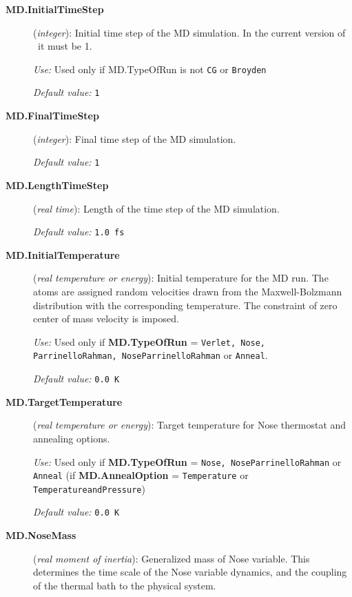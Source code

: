 \begin{description}
\item[\textbf{MD.InitialTimeStep}] (\textit{integer}):
Initial time step of the MD simulation.
In the current version of \siesta\ it must be 1.

\textit{Use:} Used only if MD.TypeOfRun is not \texttt{CG} or \texttt{Broyden}

\textit{Default value:} \texttt{1}

\item[\textbf{MD.FinalTimeStep}] (\textit{integer}):
Final time step of the MD simulation.

\textit{Default value:} \texttt{1}

\item[\textbf{MD.LengthTimeStep}] (\textit{real time}):
Length of the time step of the MD simulation.

\textit{Default value:} \texttt{1.0 fs}

\item[\textbf{MD.InitialTemperature}] (\textit{real temperature or energy}):
Initial temperature for the MD run. The atoms are assigned random
velocities drawn from the Maxwell-Bolzmann distribution with the
corresponding temperature. The constraint of zero center of
mass velocity is imposed.

\textit{Use:} Used only if \textbf{MD.TypeOfRun} = \texttt{Verlet, Nose,
ParrinelloRahman, NoseParrinelloRahman}
or \texttt{Anneal}.

\textit{Default value:} \texttt{0.0 K}


\item[\textbf{MD.TargetTemperature}] (\textit{real temperature or energy}):
Target temperature for Nose thermostat and annealing options.

\textit{Use:} Used only if \textbf{MD.TypeOfRun} = \texttt{Nose, NoseParrinelloRahman}
or \texttt{Anneal} (if \textbf{MD.AnnealOption} = \texttt{Temperature} or
\texttt{TemperatureandPressure})

\textit{Default value:} \texttt{0.0 K}



\item[\textbf{MD.NoseMass}] (\textit{real moment of inertia}):
Generalized mass of Nose variable.
This determines the time scale of the Nose variable
dynamics, and the coupling of the thermal bath to
the physical system.


\end{description}
